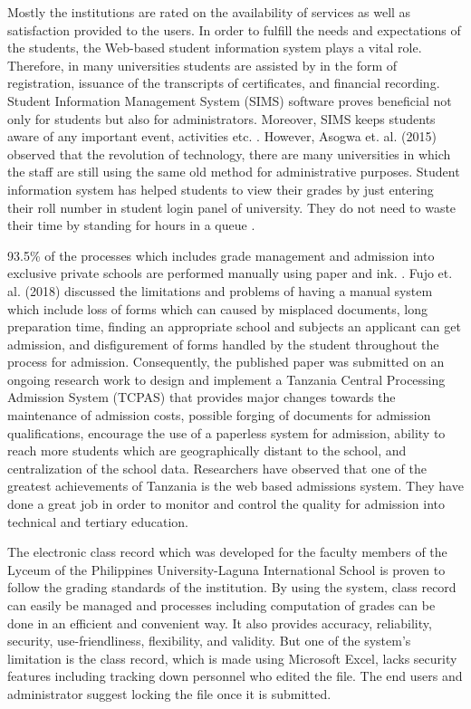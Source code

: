 \documentclass[11pt,a4paper,titlepage]{article}
\begin{document}
Mostly the institutions are rated on the availability of services as well as satisfaction provided to the users. In order to fulfill the needs and expectations of the students, the Web-based student information system plays a vital role. Therefore, in many universities students are assisted by in the form of registration,  issuance of the transcripts of certificates, and financial recording. Student Information Management System (SIMS) software proves beneficial not only for students but also for administrators. Moreover, SIMS keeps students aware of any important event, activities etc. \cite{Asogwa}. However, Asogwa et. al. (2015) observed that the revolution of technology, there are many universities in which the staff are still using the same old method for administrative purposes. Student information system has helped students to view their grades by just entering their roll number in student login panel of university. They do not need to waste their time by standing for hours in a queue \cite{SIAS}.

93.5\% of the processes which includes grade management and admission into exclusive private schools are performed manually using paper and ink. \cite{Fujo}. Fujo et. al. (2018) discussed the limitations and problems of having a manual system which include loss of forms which can caused by misplaced documents, long preparation time, finding an appropriate school and subjects an applicant can get admission, and disfigurement of forms handled by the student throughout the process for admission. Consequently, the published paper was submitted on an ongoing research work to design and implement a Tanzania Central Processing Admission System (TCPAS) that provides major changes towards the maintenance of admission costs, possible forging of documents for admission qualifications, encourage the use of a paperless system for admission, ability to reach more students which are geographically distant to the school, and centralization of the school data. Researchers have observed that one of the greatest achievements of Tanzania is the web based admissions system. They have done a great job in order to monitor and control the quality for admission into technical and tertiary education.

The electronic class record which was developed for the faculty members of the Lyceum of the Philippines University-Laguna International School is proven to follow the grading standards of the institution. By using the system, class record can easily be managed and processes including computation of grades can be done in an efficient and convenient way. It also provides accuracy, reliability, security, use-friendliness, flexibility, and validity. But one of the system's limitation is the class record, which is made using Microsoft Excel, lacks security features including tracking down personnel who edited the file. The end users and administrator suggest locking the file once it is submitted. \cite{Dellosa}
\end{document}
